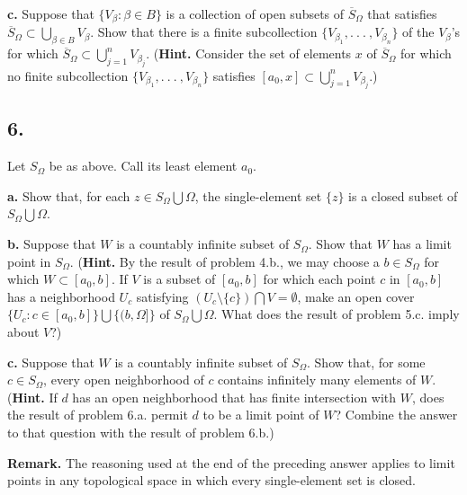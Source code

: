\documentclass{amsart}
\theoremstyle{plain}
\theoremstyle{definition}
\theoremstyle{remark}
\begin{document}
\vspace{.1in}
{\bfseries c.} Suppose that $\{ V_{\beta} : \beta \in B \}$ is a collection of open subsets of $\overline{S} _{\Omega}$ that satisfies $\overline{S} _{\Omega} \subset \bigcup _{\beta \in B} V_{\beta}$. Show that there is a finite subcollection  $\{ V_{\beta _1} , .\ .\ .\ , V_{\beta _n}\}$ of the 
$V_{\beta}$'s for which $\overline{S} _{\Omega} \subset \bigcup _{j = 1}^nV_{\beta _j}$. ({\bfseries Hint.} Consider the set of elements $x$ of $\overline{S} _{\Omega}$ for which no finite subcollection  $\{ V_{\beta _1} , .\ .\ .\ , V_{\beta _n}\}$ satisfies $[a_0 , x]  \subset \bigcup _{j = 1}^nV_{\beta _j}$.)

\vspace{.15in}

\noindent
\subsection*{6.}  Let $S_{\Omega}$ be as above. Call its least element $a_0$. 

\vspace{.1in}
{\bfseries a.} Show that, for each $z\in S_{\Omega} \bigcup \Omega$, the single-element set $\{ z\}$ is a closed subset of $S_{\Omega} \bigcup \Omega$.

\vspace{.1in}
{\bfseries b.}  Suppose that $W$ is a countably infinite subset of $S_{\Omega}$. Show that $W$ has a limit point in $S_{\Omega}$. ({\bf Hint.} By the result of problem 4.b., we may choose a $b\in S_{\Omega}$ for which $W\subset [a_0,b]$. If $V$ is a subset of $[a_0,b]$ for which each point $c$ in $[a_0,b]$ has a neighborhood $U_c$ satisfying $(U_c\setminus \{c\} )\bigcap V = \emptyset$, make an open cover $\{ U_c : c \in [a_0,b]\} \bigcup \{ (b, \Omega ]\}$ of $S_{\Omega} \bigcup \Omega$. What does the result of problem 5.c. imply about $V$?)


\vspace{.1in}
{\bfseries c.} Suppose that $W$ is a countably infinite subset of $S_{\Omega}$. Show that, for some $c\in S_{\Omega}$, every open neighborhood of $c$ contains infinitely many elements of $W$. ({\bf Hint.} If $d$ has an open neighborhood that has finite intersection with $W$, does the result of problem 6.a. permit $d$ to be a limit point of $W$? Combine the answer to that question with the result of problem 6.b.) 

\vspace{.1in}
{\bf Remark.} The reasoning used at the end of the preceding answer applies to limit points in any topological space in which every single-element set is closed. 


 
\end{document}
